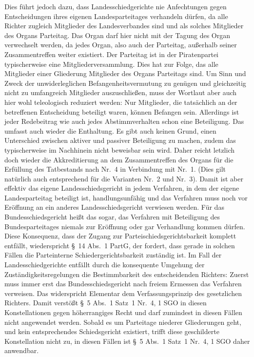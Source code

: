 Dies führt jedoch dazu, dass Landesschiedgerichte nie Anfechtungen gegen Entscheidungen ihres eigenen Landesparteitages verhandeln dürfen, da alle Richter zugleich Mitglieder des Landesverbandes sind und als solches Mitglieder des Organs Parteitag.
Das Organ darf hier nicht mit der Tagung des Organ verwechselt werden, da jedes Organ, also auch der Parteitag, außerhalb seiner Zusammentreffen weiter existiert.
Der Parteitag ist in der Piratenpartei typischerweise eine Mitgliederversammlung.
Dies hat zur Folge, das alle Mitglieder einer Gliederung Mitglieder des Organs Parteitags sind.
Um Sinn und Zweck der unwiderleglichen Befangenheitsvermutung zu genügen und gleichzeitig nicht zu umfangreich Mitglieder auszuschließen, muss der Wortlaut aber auch hier wohl teleologisch reduziert werden: Nur Mitglieder, die tatsächlich an der betreffenen Entscheidung beteiligt waren, können Befangen sein.
Allerdings ist jeder Redebeitrag wie auch jedes Abstimmverhalten schon eine Beteiligung. Das umfasst auch wieder die Enthaltung.
Es gibt auch keinen Grund, einen Unterschied zwischen aktiver und passiver Beteiligung zu machen, zudem das typischerweise im Nachhinein nicht beweisbar sein wird.
Daher reicht letzlich doch wieder die Akkreditierung an dem Zusammentreffen des Organs für die Erfüllung des Tatbestands nach Nr.~4 in Verbindung mit Nr.~1.
(Dies gilt natürlich auch entsprechend für die Varianten Nr.~2 und Nr.~3).
Damit ist aber effektiv das eigene Landesschiedsgericht in jedem Verfahren, in dem der eigene Landesparteitag beteiligt ist, handlungsunfähig und das Verfahren muss noch vor Eröffnung an ein anderes Landesschiedsgericht verwiesen werden.
Für das Bundesschiedsgericht heißt das sogar, das Verfahren mit Beteiligung des Bundesparteitages niemals zur Eröffnung oder gar Verhandlung kommen dürfen.
Diese Konsequenz, dass der Zugang zur Parteischiedsgerichtsbarkeit komplett entfällt, wiederspricht \S~14 Abs.~1 PartG, der fordert, dass gerade in solchen Fällen die Parteinterne Schiedergerichtsbarkeit zuständig ist.
Im Fall der Landesschiedgerichte entfällt durch die konsequente Umgehung der Zuständigkeitsregelungen die Bestimmbarkeit des entscheidenden Richters: Zuerst muss immer erst das Bundesschiedsgericht nach freiem Ermessen das Verfahren verweisen.
Das widerspricht Elementar dem Verfassungsprinzip des gesetzlichen Richters.
Damit verstößt \S~5 Abs.~1 Satz~1 Nr.~4, 1 SGO in diesen Konstellationen gegen höherrangiges Recht und darf zumindest in diesen Fällen nicht angewendet werden.
Sobald es um Parteitage niederer Gliederungen geht, und kein entsprechendes Schiedsgericht existiert, trifft diese geschilderte Konstellation nicht zu, in diesen Fällen ist \S~5 Abs.~1 Satz~1 Nr.~4, 1 SGO daher anwendbar.


